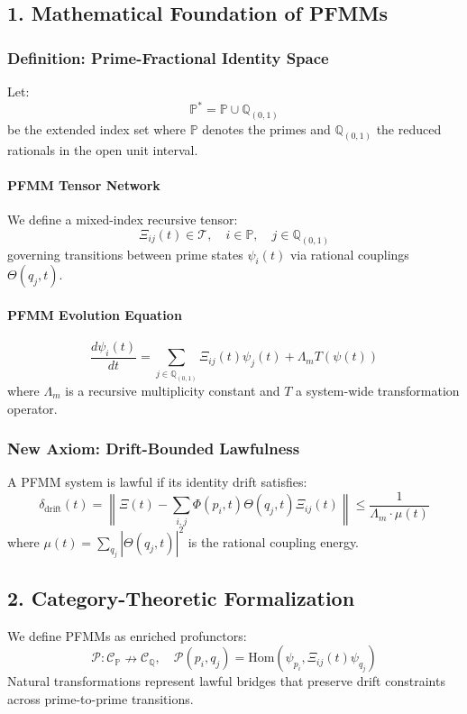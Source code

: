 \documentclass{article}
\theoremstyle{plain}
\begin{document}
\subsection{1. Mathematical Foundation of PFMMs}
\subsubsection{Definition: Prime-Fractional Identity Space}
Let:
\[
\mathbb{P}^* = \mathbb{P} \cup \mathbb{Q}_{(0,1)}
\]
be the extended index set where \(\mathbb{P}\) denotes the primes and \(\mathbb{Q}_{(0,1)}\) the reduced rationals in the open unit interval.

\paragraph{PFMM Tensor Network}
We define a mixed-index recursive tensor:
\[
\Xi_{ij}(t) \in \mathcal{T}, \quad i \in \mathbb{P}, \quad j \in \mathbb{Q}_{(0,1)}
\]
governing transitions between prime states \(\psi_i(t)\) via rational couplings \(\Theta(q_j, t)\).

\paragraph{PFMM Evolution Equation}
\[
\frac{d\psi_i(t)}{dt} = \sum_{j \in \mathbb{Q}_{(0,1)}} \Xi_{ij}(t) \psi_j(t) + \Lambda_m T(\psi(t))
\]
where \(\Lambda_m\) is a recursive multiplicity constant and \(T\) a system-wide transformation operator.

\subsubsection{New Axiom: Drift-Bounded Lawfulness}
\begin{axiom}
A PFMM system is lawful if its identity drift satisfies:
\[
\delta_{\text{drift}}(t) = \left\| \Xi(t) - \sum_{i,j} \Phi(p_i,t)\Theta(q_j,t)\Xi_{ij}(t) \right\| \leq \frac{1}{\Lambda_m \cdot \mu(t)}
\]
where \(\mu(t) = \sum_{q_j} |\Theta(q_j,t)|^2\) is the rational coupling energy.
\end{axiom}

\subsection{2. Category-Theoretic Formalization}
We define PFMMs as enriched profunctors:
\[
\mathcal{P} : \mathcal{C}_{\mathbb{P}} \nrightarrow \mathcal{C}_{\mathbb{Q}}, \quad \mathcal{P}(p_i, q_j) = \text{Hom}(\psi_{p_i}, \Xi_{ij}(t) \psi_{q_j})
\]
Natural transformations represent lawful bridges that preserve drift constraints across prime-to-prime transitions.
\end{document}
